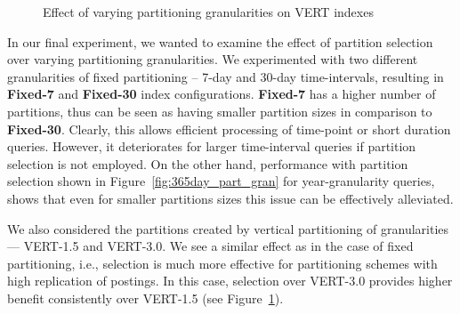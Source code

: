 \begin{figure}
  
  \caption{Effect of varying partitioning granularities on VERT indexes}
  \label{fig:365day_part_gran_sb}
\end{figure}

In our final experiment, we wanted to examine the effect of partition selection over varying partitioning granularities. We experimented with two different granularities of fixed partitioning --
7-day and 30-day time-intervals, resulting in \textbf{Fixed-7} and \textbf{Fixed-30}
index configurations. \textbf{Fixed-7} has a higher number of partitions,
thus can be seen as having smaller partition sizes in comparison to
\textbf{Fixed-30}. Clearly, this allows efficient processing of time-point
or short duration queries. However, it deteriorates for larger
time-interval queries if partition selection is not employed. On the other hand, performance with partition selection shown in
Figure~\ref{fig:365day_part_gran} for year-granularity queries,
shows that even for smaller partitions sizes this issue can be
effectively alleviated. 

We also considered the partitions created by vertical partitioning of granularities --- VERT-1.5 and VERT-3.0. We see a similar effect as in the case of fixed partitioning, i.e., selection is much more effective for partitioning schemes with high replication of postings. In this case, selection over VERT-3.0 provides higher benefit consistently over VERT-1.5 (see Figure~\ref{fig:365day_part_gran_sb}). 

